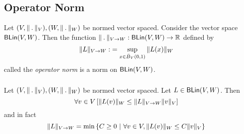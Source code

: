 \subsection{Operator Norm}
\uprop Let $(V, \norm_V), (W, \norm_W)$ be normed vector spaced. Consider the vector
space $\mathsf{BLin}(V,W)$. Then the function $\opnormd : \blin(V,W) \to \R$ defined by
\begin{align*}
    \| L \|_{V \to W} :&= \sup_{x \in \bar{B}_V(0,1)} \| L(x) \|_W \\
\end{align*}
called the \emph{operator norm} is a norm on $\mathsf{BLin}(V,W)$.

\subsubsection*{}
\uprop Let $(V, \norm_V), (W, \norm_W)$ be normed vector spaced.
Let $L \in \mathsf{BLin}(V,W)$. Then
\[
    \forall v \in V \left[ \| L(v) \|_W \leq \| L \|_{V \to W} \| v \|_V \right]
\]
and in fact
\[
    \opnorm{L} = \min \left\{ C \geq 0\ \middle|\ \forall v \in V, \| L(v) \|_W \leq C \| v \|_V \right\}
\]
